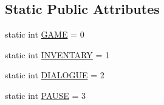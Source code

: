 \subsection*{Static Public Attributes}
\begin{DoxyCompactItemize}
\item 
static int \mbox{\hyperlink{classstates_1_1_game_state_a8617f1d8be7bed020eeab9384e731bc6}{G\+A\+ME}} = 0
\item 
static int \mbox{\hyperlink{classstates_1_1_game_state_a4cc6c1ac20c3d3590424e5b199a4663c}{I\+N\+V\+E\+N\+T\+A\+RY}} = 1
\item 
static int \mbox{\hyperlink{classstates_1_1_game_state_ae5ee1ef1d4462e5a6667b05addc61fb6}{D\+I\+A\+L\+O\+G\+UE}} = 2
\item 
static int \mbox{\hyperlink{classstates_1_1_game_state_a47d917ebca3ed09f171231d9e36cf2e3}{P\+A\+U\+SE}} = 3
\end{DoxyCompactItemize}
